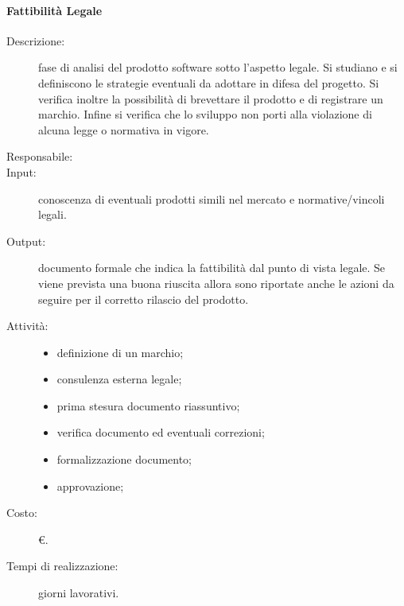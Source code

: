 \paragraph{Fattibilità Legale}
\begin{description}
\item[Descrizione:] fase di analisi del prodotto software sotto l'aspetto legale. Si studiano e si definiscono le strategie eventuali da adottare in difesa del progetto. Si verifica inoltre la possibilità di brevettare il prodotto e di registrare un marchio. Infine si verifica che lo sviluppo non porti alla violazione di alcuna legge o normativa in vigore.
\item[Responsabile:]
\item[Input:] conoscenza di eventuali prodotti simili nel mercato e normative/vincoli legali.
\item[Output:] documento formale che indica la fattibilità dal punto di vista legale. Se viene prevista una buona riuscita allora sono riportate anche le azioni da seguire per il corretto rilascio del prodotto.
\item[Attività:]
\begin{itemize}
\item definizione di un marchio;
\item consulenza esterna legale;
\item prima stesura documento riassuntivo;
\item verifica documento ed eventuali correzioni;
\item formalizzazione documento;
\item approvazione;
\end{itemize}
\item[Costo:] \euro{}.
\item[Tempi di realizzazione:]  giorni lavorativi.
\end{description}

